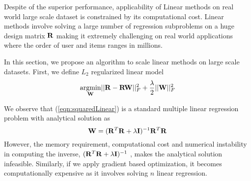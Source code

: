 

Despite of the superior performance, applicability of Linear methods on real world large scale dataset is constrained by its computational cost. Linear methods involve solving  a large number of regression subproblems on a huge design matrix $\mathbf{R}$ making it extremely challenging on real world applications where the order of user and items ranges in millions.

In this section, we propose an algorithm to scale linear methods on large scale datasets. First, we define $L_2$ regularized linear model 
\begin{equation}
\label{eqn:squaredLinear}
\underset{\mathbf{W}}{\mathrm{argmin}}|| \mathbf{R} - \mathbf{R} \mathbf{W} ||_F^2 + \frac{\lambda}{2} || \mathbf{W} ||_F^2 
\end{equation}

We observe that (\ref{eqn:squaredLinear}) is a  standard multiple linear regression problem with analytical solution as
\begin{equation}
\mathbf{W} = (\mathbf{R}^T \mathbf{R} + \lambda \mathbf{I})^{-1} \mathbf{R}^T \mathbf{R}
\end{equation}
However, the  memory requirement, computational cost and  numerical instability in computing the inverse, $(\mathbf{R}^T \mathbf{R} + \lambda \mathbf{I})^{-1}$ , makes the analytical solution infeasible. Similarly, if we apply gradient based optimization, it becomes computationally expensive as it involves solving $n$ linear regression.

